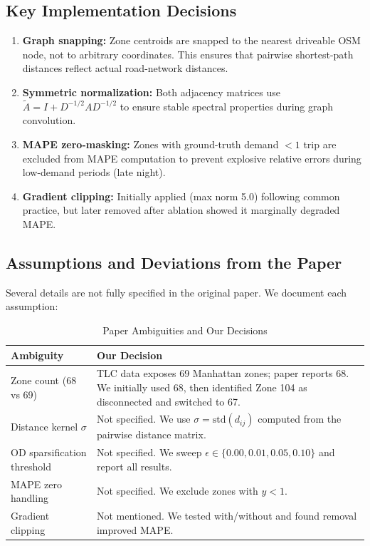 \documentclass{rapportECL}
\begin{document}
\subsection{Key Implementation Decisions}
\begin{enumerate}[leftmargin=*]
    \item \textbf{Graph snapping:} Zone centroids are snapped to the nearest driveable OSM node, not to arbitrary coordinates. This ensures that pairwise shortest-path distances reflect actual road-network distances.
    \item \textbf{Symmetric normalization:} Both adjacency matrices use $\tilde{A} = I + D^{-1/2}AD^{-1/2}$ to ensure stable spectral properties during graph convolution.
    \item \textbf{MAPE zero-masking:} Zones with ground-truth demand $< 1$ trip are excluded from MAPE computation to prevent explosive relative errors during low-demand periods (late night).
    \item \textbf{Gradient clipping:} Initially applied (max norm 5.0) following common practice, but later removed after ablation showed it marginally degraded MAPE.
\end{enumerate}

\subsection{Assumptions and Deviations from the Paper}
Several details are not fully specified in the original paper. We document each assumption:

\begin{table}[H]
\centering
\caption{Paper Ambiguities and Our Decisions}
\begin{tabular}{@{}p{4cm}p{8cm}@{}}
\toprule
\textbf{Ambiguity} & \textbf{Our Decision} \\ \midrule
Zone count (68 vs 69) & TLC data exposes 69 Manhattan zones; paper reports 68. We initially used 68, then identified Zone 104 as disconnected and switched to 67. \\
Distance kernel $\sigma$ & Not specified. We use $\sigma = \text{std}(d_{ij})$ computed from the pairwise distance matrix. \\
OD sparsification threshold & Not specified. We sweep $\epsilon \in \{0.00, 0.01, 0.05, 0.10\}$ and report all results. \\
MAPE zero handling & Not specified. We exclude zones with $y < 1$. \\
Gradient clipping & Not mentioned. We tested with/without and found removal improved MAPE. \\ \bottomrule
\end{tabular}
\end{table}
\end{document}
